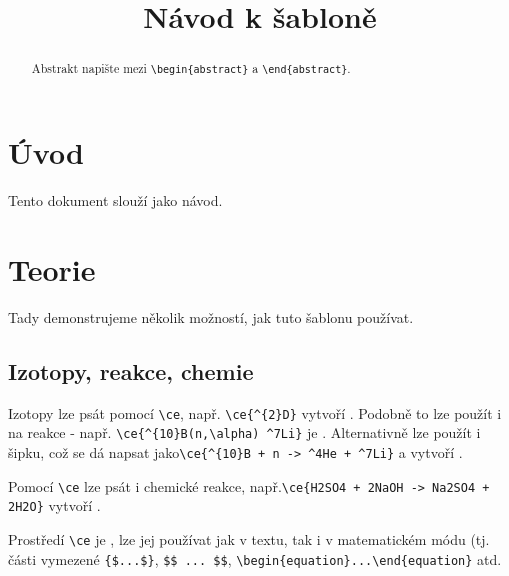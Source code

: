 \documentclass{cygclanek}
\begin{document}
\title{Návod k šabloně}



\maketitle
\begin{abstract}
    Abstrakt napište mezi \verb|\begin{abstract}| a \verb|\end{abstract}|.
\end{abstract}

\section{Úvod}

Tento dokument slouží jako návod. 

\section{Teorie}
Tady demonstrujeme několik možností, jak tuto šablonu používat.

\subsection{Izotopy, reakce, chemie}
Izotopy lze psát pomocí \verb|\ce|, např. \verb|\ce{^{2}D}| vytvoří . Podobně to lze použít i na 
reakce - např. \verb|\ce{^{10}B(n,\alpha) ^7Li}| je . Alternativně lze 
použít i šipku, což se dá napsat jako\newline\verb|\ce{^{10}B + n -> ^4He + ^7Li}| 
a vytvoří . 

Pomocí \verb|\ce| lze psát i chemické reakce, např.\verb|\ce{H2SO4 + 2NaOH -> Na2SO4 + 2H2O}| vytvoří .

    Prostředí \verb|\ce| je , lze jej používat jak v textu, tak i v matematickém módu 
    (tj. části vymezené \verb|{$...$}|, \verb|$$ ... $$|, \verb|\begin{equation}...\end{equation}| atd.
\end{document}
